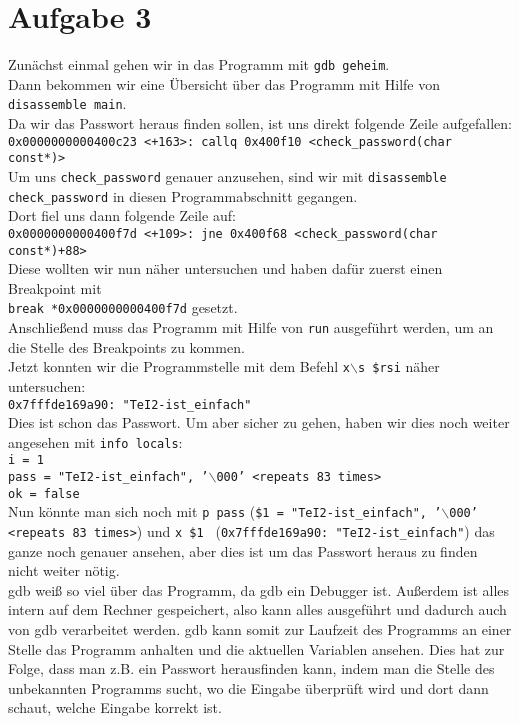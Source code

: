 \documentclass{ti2}
\begin{document}
\section*{Aufgabe 3}
Zunächst einmal gehen wir in das Programm mit \texttt{gdb geheim}. \\
Dann bekommen wir eine Übersicht über das Programm mit Hilfe von \texttt{disassemble main}. \\
Da wir das Passwort heraus finden sollen, ist uns direkt folgende Zeile aufgefallen: \\
\texttt{0x0000000000400c23 <+163>:   callq  0x400f10 <check\_password(char const*)>} \\
Um uns \texttt{check\_password} genauer anzusehen, sind wir mit \texttt{disassemble check\_password} in diesen Programmabschnitt gegangen. \\
Dort fiel uns dann folgende Zeile auf: \\
\texttt{0x0000000000400f7d <+109>:   jne    0x400f68 <check\_password(char const*)+88>} \\
Diese wollten wir nun näher untersuchen und haben dafür zuerst einen Breakpoint mit \\ \texttt{break *0x0000000000400f7d} gesetzt. \\
Anschließend muss das Programm mit Hilfe von \texttt{run} ausgeführt werden, um an die Stelle des Breakpoints zu kommen. \\
Jetzt konnten wir die Programmstelle mit dem Befehl \texttt{x$\backslash$s \$rsi} näher untersuchen: \\
\texttt{0x7fffde169a90: "TeI2-ist\_einfach"} \\
Dies ist schon das Passwort. Um aber sicher zu gehen, haben wir dies noch weiter angesehen mit \texttt{info locals}: \\
\texttt{i = 1} \\
\texttt{pass = "TeI2-ist\_einfach", '$\backslash$000' <repeats 83 times>} \\
\texttt{ok = false} \\
Nun könnte man sich noch mit \texttt{p pass} (\texttt{\$1 = "TeI2-ist\_einfach", '$\backslash$000' <repeats 83 times>}) und \texttt{x \$1 } (\texttt{0x7fffde169a90: "TeI2-ist\_einfach"}) das ganze noch genauer ansehen, aber dies ist um das Passwort heraus zu finden nicht weiter nötig. \\
gdb weiß so viel über das Programm, da gdb ein Debugger ist. Außerdem ist alles intern auf dem Rechner gespeichert, also kann alles ausgeführt und dadurch auch von gdb verarbeitet werden. gdb kann somit zur Laufzeit des Programms an einer Stelle das Programm anhalten und die aktuellen Variablen ansehen. Dies hat zur Folge, dass man z.B. ein Passwort herausfinden kann, indem man die Stelle des unbekannten Programms sucht, wo die Eingabe überprüft wird und dort dann schaut, welche Eingabe korrekt ist.
\end{document}
